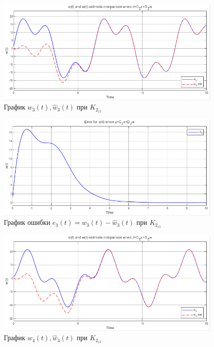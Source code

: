 \documentclass[a4paper, 12pt]{article}
\begin{document}
    \begin{figure}[H]
        \centering
        \includegraphics[scale=0.75]{3task_wwh3czdz.png}
        \captionsetup{skip=0pt}
        \caption{График $w_3(t),\hat{w}_3(t)$ при $K_{2_{z1}}$}
        \label{fig:3task_wwh3czdz}
    \end{figure}
    \begin{figure}[H]
        \centering
        \includegraphics[scale=0.75]{3task_we3czdz.png}
        \captionsetup{skip=0pt}
        \caption{График ошибки $e_3(t)=w_3(t)-\hat{w}_3(t)$ при $K_{2_{z1}}$}
        \label{fig:3task_we3czdz}
    \end{figure}
    \begin{figure}[H]
        \centering
        \includegraphics[scale=0.75]{3task_wwh4czdz.png}
        \captionsetup{skip=0pt}
        \caption{График $w_4(t),\hat{w}_4(t)$ при $K_{2_{z1}}$}
        \label{fig:3task_wwh4czdz}
    \end{figure}
\end{document}
